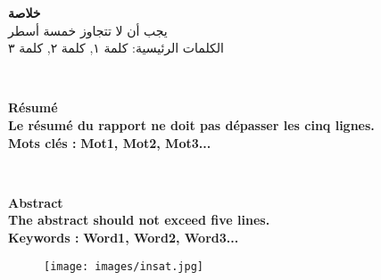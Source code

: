 \documentclass[oneside,12pt]{Classes/aesm_edspia}
\begin{document}
\setlength{\parindent}{0pt}
\setlength{\topmargin}{0mm}
\setlength{\headheight}{0cm}
\setlength{\headsep}{0cm}
\setlength{\textheight}{20cm}
\setlength{\textwidth}{17cm}
\setlength{\marginparsep}{0cm}
\setlength{\marginparwidth}{0cm}
\setlength{\headheight}{0cm}
\setlength{\footskip}{0cm}

\pagestyle{fancy}


\begin{center}
\hbox{\raisebox{0.2em}{\vrule depth 0pt height 1pt width 17cm}}
\end{center}
\begin{minipage}[c]{\textwidth}
  \textbf{خلاصة}\\ [0.4cm]
\footnotesize
يجب أن لا تتجاوز خمسة أسطر \\[0.4cm]
الكلمات الرئيسية:
    كلمة ١, كلمة ٢, كلمة ٣
\end{minipage}
\\[1.5cm]
\begin{center}
\hbox{\raisebox{0.2em}{\vrule depth 0pt height 1pt width 17cm}}
\end{center}
\begin{minipage}[c]{\textwidth}
\textbf{Résumé}\\[0.4cm]
\footnotesize
\textbf{Le résumé du rapport ne doit pas dépasser les cinq lignes.}
\\[0.4cm]
\textbf{Mots clés :} \textbf{Mot1, Mot2, Mot3...}
\end{minipage}
\\[1.5cm]
\begin{center}
\hbox{\raisebox{0.2em}{\vrule depth 0pt height 1pt width 17cm}}
\end{center}
\begin{minipage}[c]{\textwidth}
\textbf{Abstract}\\[0.4cm]
\footnotesize
\textbf{The abstract should not exceed five lines. }
\\[0.4cm]
\textbf{Keywords :} \textbf{Word1, Word2, Word3...}
\end{minipage}%
\begin{center}
\begin{figure}
\texttt{[image: images/insat.jpg]}
\end{figure}
\end{center}

\renewcommand{\footrulewidth}{1pt}
\fancyfoot[L]{}
\fancyfoot[R]{}
\end{document}
